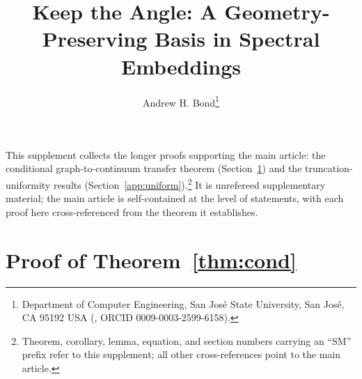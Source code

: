 \documentclass[review,supplement]{siamart220329}
\title{Keep the Angle: A Geometry-Preserving Basis in Spectral Embeddings}
\author{Andrew H. Bond\thanks{Department of Computer Engineering, San Jos\'e
State University, San Jos\'e, CA 95192 USA (\email{andrew.bond@sjsu.edu}, ORCID
0009-0003-2599-6158).}}
\begin{document}
\maketitle

This supplement collects the longer proofs supporting the main article: the
conditional graph-to-continuum transfer theorem (Section~\ref{app:proof}) and the
truncation-uniformity results (Section~\ref{app:uniform}).\footnote{Theorem,
corollary, lemma, equation, and section numbers carrying an ``SM'' prefix refer to
this supplement; all other cross-references point to the main article.} It is
unrefereed supplementary material; the main article is self-contained at the level
of statements, with each proof here cross-referenced from the theorem it
establishes.

\section{Proof of Theorem~\ref{thm:cond}}\label{app:proof}
\end{document}
